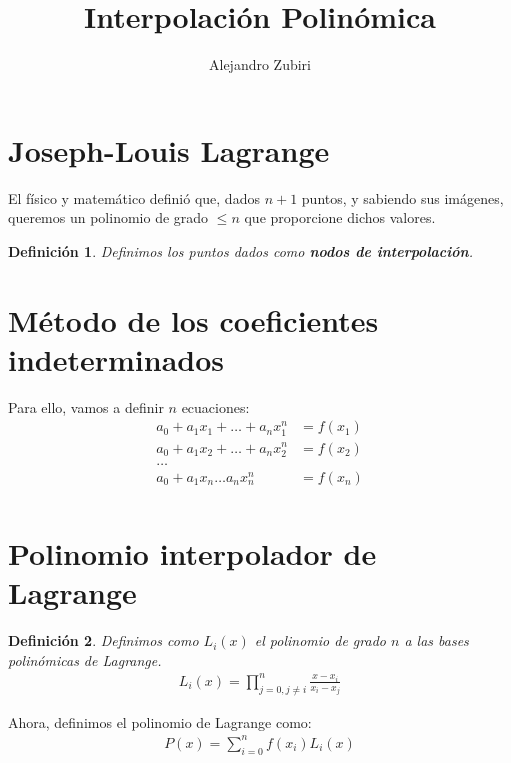\documentclass{article}
\author{Alejandro Zubiri}
\title{Interpolación Polinómica}
\newtheorem{defi}{Definición}
\begin{document}
\maketitle
\section{Joseph-Louis Lagrange}
El físico y matemático definió que, dados $n+1$ puntos, y sabiendo sus imágenes, queremos un polinomio de grado $\leq n$ que proporcione dichos valores.
\begin{defi}
	Definimos los puntos dados como \textbf{nodos de interpolación}.
\end{defi}
\section{Método de los coeficientes indeterminados}
Para ello, vamos a definir $n$ ecuaciones:
\begin{equation}
	\begin{split}
		a_0 +a_1x_1+\dots+a_nx_1^n&=f(x_1)\\
		a_0+a_1x_2+\dots + a_nx_2^n &= f(x_2)\\
		\dots\\
		a_0+a_1x_n\dots a_nx_n^n &= f(x_n)\\
	\end{split}
\end{equation}
\section{Polinomio interpolador de Lagrange}
\begin{defi}
	Definimos como $L_i(x)$ el polinomio de grado $n$ a las bases polinómicas de Lagrange.
	\begin{equation}
		\begin{split}
			L_i(x)= \prod_{j=0, j \neq i}^n \frac{x-x_i}{x_i-x_j}
		\end{split}
	\end{equation}
\end{defi}
Ahora, definimos el polinomio de Lagrange como:
\begin{equation}
	\begin{split}
		P(x)=\sum_{i=0}^n f(x_i)L_i(x)
	\end{split}
\end{equation}
\end{document}
